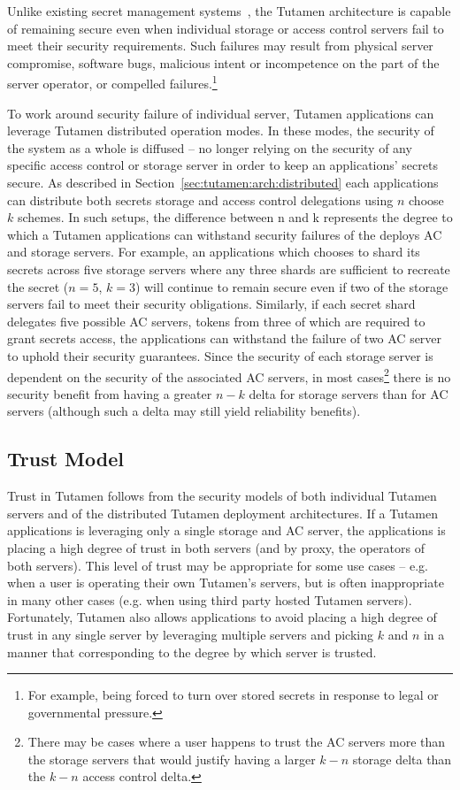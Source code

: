 Unlike existing secret management systems~\cite{vault, confidant,
  keywhiz}, the Tutamen architecture is capable of remaining secure
even when individual storage or access control servers fail to meet
their security requirements. Such failures may result from physical
server compromise, software bugs, malicious intent or incompetence on
the part of the server operator, or compelled failures.\footnote{For
  example, being forced to turn over stored secrets in response to
  legal or governmental pressure.}

To work around security failure of individual server, Tutamen
applications can leverage Tutamen distributed operation modes. In
these modes, the security of the system as a whole is diffused -- no
longer relying on the security of any specific access control or
storage server in order to keep an applications' secrets secure. As
described in Section~\ref{sec:tutamen:arch:distributed} each
applications can distribute both secrets storage and access control
delegations using $n$ choose $k$ schemes. In such setups, the
difference between n and k represents the degree to which a Tutamen
applications can withstand security failures of the deploys AC and
storage servers. For example, an applications which chooses to shard
its secrets across five storage servers where any three shards are
sufficient to recreate the secret ($n=5$, $k=3$) will continue to
remain secure even if two of the storage servers fail to meet their
security obligations. Similarly, if each secret shard delegates five
possible AC servers, tokens from three of which are required to grant
secrets access, the applications can withstand the failure of two AC
server to uphold their security guarantees. Since the security of each
storage server is dependent on the security of the associated AC
servers, in most cases\footnote{There may be cases where a user
  happens to trust the AC servers more than the storage servers that
  would justify having a larger $k-n$ storage delta than the $k-n$
  access control delta.} there is no security benefit from having a
greater $n-k$ delta for storage servers than for AC servers (although
such a delta may still yield reliability benefits).

\subsection{Trust Model}

Trust in Tutamen follows from the security models of both individual
Tutamen servers and of the distributed Tutamen deployment
architectures. If a Tutamen applications is leveraging only a single
storage and AC server, the applications is placing a high degree of
trust in both servers (and by proxy, the operators of both
servers). This level of trust may be appropriate for some use cases --
e.g. when a user is operating their own Tutamen's servers, but is
often inappropriate in many other cases (e.g. when using third party
hosted Tutamen servers). Fortunately, Tutamen also allows applications
to avoid placing a high degree of trust in any single server by
leveraging multiple servers and picking $k$ and $n$ in a manner that
corresponding to the degree by which server is trusted.

